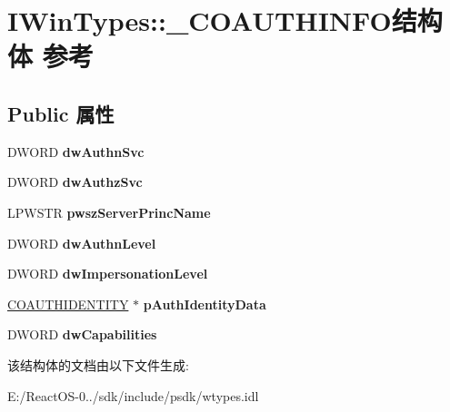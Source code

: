 \hypertarget{struct_i_win_types_1_1___c_o_a_u_t_h_i_n_f_o}{}\section{I\+Win\+Types\+:\+:\+\_\+\+C\+O\+A\+U\+T\+H\+I\+N\+F\+O结构体 参考}
\label{struct_i_win_types_1_1___c_o_a_u_t_h_i_n_f_o}
\subsection*{Public 属性}
\begin{DoxyCompactItemize}
\item 
\mbox{\label{struct_i_win_types_1_1___c_o_a_u_t_h_i_n_f_o_a5d70890d25c7c27b3d98d4c7140c868f}} 
D\+W\+O\+RD {\bfseries dw\+Authn\+Svc}
\item 
\mbox{\label{struct_i_win_types_1_1___c_o_a_u_t_h_i_n_f_o_a5de3df309228dbf15ed72e2f00dd4ef6}} 
D\+W\+O\+RD {\bfseries dw\+Authz\+Svc}
\item 
\mbox{\label{struct_i_win_types_1_1___c_o_a_u_t_h_i_n_f_o_aefa950a5fa95500f18e7970d000b3014}} 
L\+P\+W\+S\+TR {\bfseries pwsz\+Server\+Princ\+Name}
\item 
\mbox{\label{struct_i_win_types_1_1___c_o_a_u_t_h_i_n_f_o_a15c5e3089b64a1e1e76dfbbc8789d40e}} 
D\+W\+O\+RD {\bfseries dw\+Authn\+Level}
\item 
\mbox{\label{struct_i_win_types_1_1___c_o_a_u_t_h_i_n_f_o_a2175b5e5c769bf99bfd71ca504cabfbe}} 
D\+W\+O\+RD {\bfseries dw\+Impersonation\+Level}
\item 
\mbox{\label{struct_i_win_types_1_1___c_o_a_u_t_h_i_n_f_o_a40b375454f08addbeeab652d6d29547a}} 
\hyperlink{struct_i_win_types_1_1___c_o_a_u_t_h_i_d_e_n_t_i_t_y}{C\+O\+A\+U\+T\+H\+I\+D\+E\+N\+T\+I\+TY} $\ast$ {\bfseries p\+Auth\+Identity\+Data}
\item 
\mbox{\label{struct_i_win_types_1_1___c_o_a_u_t_h_i_n_f_o_aff1f144e60d02c9ceb7aa99526410a8e}} 
D\+W\+O\+RD {\bfseries dw\+Capabilities}
\end{DoxyCompactItemize}


该结构体的文档由以下文件生成\+:\begin{DoxyCompactItemize}
\item 
E\+:/\+React\+O\+S-\/0../sdk/include/psdk/wtypes.\+idl\end{DoxyCompactItemize}
